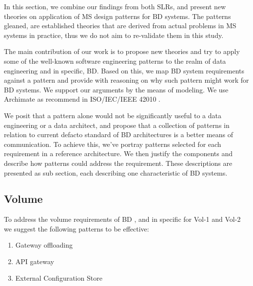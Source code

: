 \documentclass{bmcart}
\begin{document}
In this section, we combine our findings from both SLRs, and present new theories on application of MS design patterns for BD systems. The patterns gleaned, are established theories that are derived from actual problems in MS systems in practice, thus we do not aim to re-validate them in this study. 

The main contribution of our work is to propose new theories and try to apply some of the well-known software engineering patterns to the realm of data engineering and in specific, BD. Based on this, we map BD system requirements against a pattern and provide with reasoning on why such pattern might work for BD systems. We support our arguments by the means of modeling. We use Archimate \cite{lankhorst2013language} as recommend in ISO/IEC/IEEE 42010 \cite{Chaabane}. 


We posit that a pattern alone would not be significantly useful to a data engineering or a data architect, and propose that a collection of patterns in relation to current defacto standard of BD architectures is a better means of communication. To achieve this, we've portray patterns selected for each requirement in a reference architecture. We then justify the components and describe how patterns could address the requirement. These descriptions are presented as sub section, each describing one characteristic of BD systems. 


\subsection{Volume} \label{volume}


To address the volume requirements of BD , and in specific for Vol-1 and Vol-2 we suggest the following patterns to be effective:

\begin{enumerate}
  \item Gateway offloading
  \item API gateway
  \item External Configuration Store
\end{enumerate}
\end{document}

